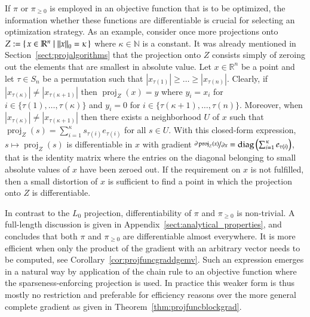 \documentclass[twoside,11pt]{article}
\DeclareMathOperator{\proj}{proj}
\DeclareMathOperator{\diag}{diag}
\newcommand{\N}{\mathbb{N}}
\newcommand{\R}{\mathbb{R}}
\newcommand{\0}{\mathcal{O}}
\newcommand{\norm}[1]{\left\Vert#1\right\Vert}
\newcommand{\abs}[1]{\left\vert #1 \right\vert}
\newcommand{\discint}[2]{\{#1,\dotsc,#2\}}
\begin{document}
If $\pi$ or $\pi_{\geq 0}$ is employed in an objective function that is to be optimized, the information whether these functions are differentiable is crucial for selecting an optimization strategy.
As an example, consider once more projections onto $Z := \set{x\in\R^n | \norm{x}_0 = \kappa}$ where $\kappa\in\N$ is a constant.
It was already mentioned in Section~\ref{sect:projalgorithms} that the projection onto $Z$ consists simply of zeroing out the elements that are smallest in absolute value.
Let $x\in\R^n$ be a point and let $\tau\in S_n$ be a permutation such that $\abs{x_{\tau(1)}} \geq \dots \geq \abs{x_{\tau(n)}}$.
Clearly, if $\abs{x_{\tau(\kappa)}} \neq \abs{x_{\tau(\kappa + 1)}}$ then $\proj_Z(x) = y$ where $y_i = x_i$ for $i\in\discint{\tau(1)}{\tau(\kappa)}$ and $y_i = 0$ for $i\in\discint{\tau(\kappa + 1)}{\tau(n)}$.
Moreover, when $\abs{x_{\tau(\kappa)}} \neq \abs{x_{\tau(\kappa + 1)}}$ then there exists a neighborhood $U$ of $x$ such that $\proj_Z(s) = \sum_{i=1}^\kappa s_{\tau(i)}e_{\tau(i)}$ for all $s\in U$.
With this closed-form expression, $s\mapsto\proj_Z(s)$ is differentiable in $x$ with gradient $\nicefrac{\partial\proj_Z(x)}{\partial x} = \diag\left(\sum_{i=1}^\kappa e_{\tau(i)}\right)$, that is the identity matrix where the entries on the diagonal belonging to small absolute values of $x$ have been zeroed out.
If the requirement on $x$ is not fulfilled, then a small distortion of $x$ is sufficient to find a point in which the projection onto $Z$ is differentiable.

In contrast to the $L_0$ projection, differentiability of $\pi$ and $\pi_{\geq 0}$ is non-trivial.
A full-length discussion is given in Appendix~\ref{sect:analytical_properties}, and concludes that both $\pi$ and $\pi_{\geq 0}$ are differentiable almost everywhere.
It is more efficient when only the product of the gradient with an arbitrary vector needs to be computed, see Corollary~\ref{cor:projfuncgraddgemv}.
Such an expression emerges in a natural way by application of the chain rule to an objective function where the sparseness-enforcing projection is used.
In practice this weaker form is thus mostly no restriction and preferable for efficiency reasons over the more general complete gradient as given in Theorem~\ref{thm:projfuncblockgrad}.
\end{document}
